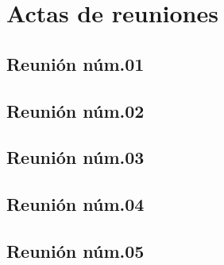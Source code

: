 \documentclass[10pt,spanish]{article}
\let\stdsection\section
\renewcommand\section{\newpage\stdsection}
\begin{document}

\section{Actas de reuniones}
\label{anex:actasReuniones}


\subsection{Reunión núm.01}
\label{anex:actaReunion1}


\subsection{Reunión núm.02}
\label{anex:actaReunion2}


\subsection{Reunión núm.03}
\label{anex:actaReunion3}


\subsection{Reunión núm.04}
\label{anex:actaReunion4}


\subsection{Reunión núm.05}
\label{anex:actaReunion5}


%
\end{document}
